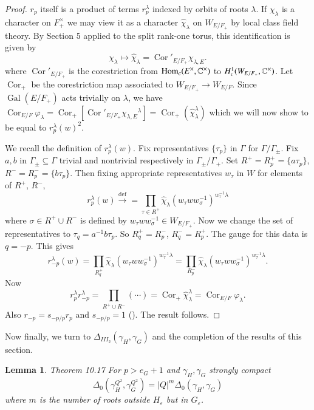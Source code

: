 \documentclass[11pt]{amsart}
\theoremstyle{plain}
\newtheorem{lemma}[theorem]{Lemma}
\theoremstyle{definition}
\def\Gal{\operatorname{\text{Gal}}}          %
\def\Hom{\operatorname{Hom}}         %
\def\Def{\overset{\operatorname{def}}\to=}   %
\def\varep{\varepsilon}
\def\LANGLANDSO{21}
\begin{document}
\begin{proof}  $r_p$ itself is a product of terms $r_p^\lambda$ indexed by orbits
of roots $\lambda$. 
If $\chi_\lambda$ is a character on $F_+^\times$ we may view it as
a character $\widehat \chi_\lambda$ on $W_{E/F_+}$ by local
class field theory. By Section 5 applied to the split rank-one torus, 
this identification is given by
$$
\chi_\lambda\mapsto \widehat\chi_\lambda =\operatorname{Cor}'_{E/F_+}\chi_{\lambda,E}.
$$
where $\operatorname{Cor}'_{E/F_+}$ is the corestriction from $\Hom_c(E^\times,\Bbb C^\times)$ to 
$H^1_c(W_{E/F_+},\Bbb C^\times)$.  Let $\operatorname{Cor}_+$ be the corestriction
map associated to $W_{E/F_+}\to W_{E/F}$. 
Since $\Gal(E/F_+)$ acts trivially on $\lambda$,
we have
$\operatorname{Cor}_{E/F}\varphi_\lambda
=\operatorname{Cor}_{+}\left[
\operatorname{Cor}'_{E/F_+}{\chi_{\lambda,E}}^\lambda\right]
=\operatorname{Cor}_{+}(\widehat\chi_\lambda^\lambda)$
which we will now show to be equal to $r_p^{\lambda}(w)^2$. 

We recall
the definition of $r_p^{\lambda}(w)$.
Fix representatives $\{\tau_p\}$
in $\Gamma$ for $\Gamma/\Gamma_\pm$.  Fix 
$a,b$ in $\Gamma_{\pm}\subseteq\Gamma$ trivial and nontrivial
respectively in $\Gamma_\pm/\Gamma_+$.  Set 
$ R^+ = R^+_p=\{a\tau_p\}$, $R^- = R^-_p = \{b\tau_p\}$.
Then fixing appropriate representatives $w_\tau$ in $W$ for elements of $R^+$,
$R^-$,
$$
r_p^{\lambda}(w)\Def
\prod_{\tau\in R^+}\widehat\chi_\lambda(w_\tau ww_\sigma^{-1})^{
w_\tau^{-1}\lambda}
$$
where $\sigma\in R^+\cup R^-$ is defined by
$w_\tau ww_\sigma^{-1}\in W_{E/F_+}$.  Now we change 
the set
of representatives to $\tau_q=a^{-1}b\tau_p$.
So $R^+_q = R^-_p$, $R^-_q=R^+_p$.
The gauge for this data is $q= -p$.  This gives
$$
r_{-p}^{\lambda}(w) =\prod_{R^+_q}
\widehat\chi_\lambda(w_\tau ww_\sigma^{-1})^{
w_\tau^{-1}\lambda}
=\prod_{R^-_p}\widehat \chi_\lambda(
w_\tau ww_\sigma^{-1})^{w_\tau^{-1}\lambda}.
$$
Now
$$
r_p^{\lambda}r_{-p}^{\lambda}
=\prod_{R^+\cup R^-}(\cdots)
=\operatorname{Cor}_{+}\widehat\chi_\lambda^\lambda
=\operatorname{Cor}_{E/F}\varphi_\lambda.
$$
Also $r_{-p}=s_{-p/p}r_p$
and $s_{-p/p} = 1$ (\cite{\LANGLANDSO, 2.4}).
The result follows.
\end{proof}

Now finally, we turn to $\Delta_{III_2}(\gamma_H,\gamma_G)$
and the completion of the results of this section.

\begin{lemma}{Theorem 10.17}  For $p>e_G+1$ 
and $\gamma_H,\gamma_G$
strongly compact
$$
\Delta_0(\gamma_H^{Q^2},\gamma_G^{Q^2})
=|Q|^m\Delta_0(\gamma_H,\gamma_G)
$$
where $m$ is the number of roots outside $H_{\varep}$
but in $G_{\varep}$.
\end{lemma}
\end{document}
